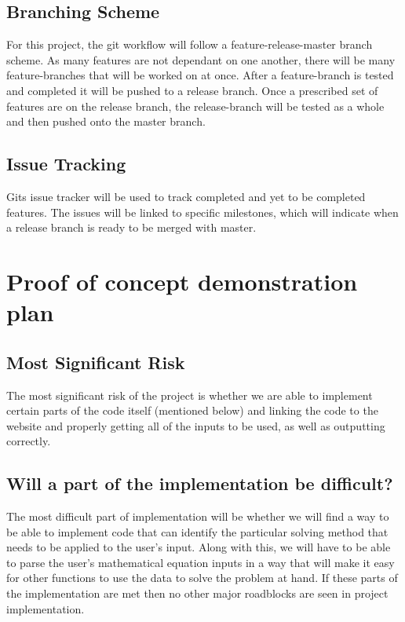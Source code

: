 \documentclass[12pt,fleqn]{article}
\begin{document}
\subsection*{Branching Scheme}
For this project, the git workflow will follow a feature-release-master branch scheme. As many features are not dependant on one another, there will be many feature-branches that will be worked on at once. After a feature-branch is tested and completed it will be pushed to a release branch. Once a prescribed set of features are on the release branch, the release-branch will be tested as a whole and then pushed onto the master branch.

\subsection*{Issue Tracking}
Gits issue tracker will be used to track completed and yet to be completed features. The issues will be linked to specific milestones, which will indicate when a release branch is ready to be merged with master.

\section *{Proof of concept demonstration plan}

\subsection*{Most Significant Risk}
The most significant risk of the project is whether we are able to implement certain parts of the code itself (mentioned below) and linking the code to the website and properly getting all of the inputs to be used, as well as outputting correctly.

\subsection*{Will a part of the implementation be difficult?}
The most difficult part of implementation will be whether we will find a way to be able to implement code that can identify the particular solving method that needs to be applied to the user’s input. Along with this, we will have to be able to parse the user’s mathematical equation inputs in a way that will make it easy for other functions to use the data to solve the problem at hand. If these parts of the implementation are met then no other major roadblocks are seen in project implementation. 
\end{document}
